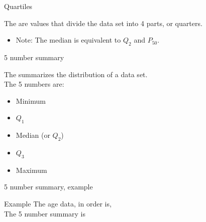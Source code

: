 \documentclass[xcolor=table, aspectratio=169, bigger]{beamer}
\begin{document}
\begin{frame}{Quartiles}
\begin{block}{}
The  are values that divide the data set into 4 parts, or quarters.\\
\smallskip
{}
\begin{itemize}
\pause
\item Note: The median is equivalent to $Q_2$ and $P_{50}$.
\end{itemize}
\end{block}
\end{frame}

\begin{frame}{5 number summary}
\begin{block}{}
The  summarizes the distribution of a data set.\\
\medskip
The 5 numbers are:
\begin{itemize}
\item Minimum
\item $Q_1$
\item Median (or $Q_2$)
\item $Q_3$
\item Maximum
\end{itemize}
\end{block}
\end{frame}

\begin{frame}{5 number summary, example}
\begin{exampleblock}{Example}
The age data, in order is, \\ \smallskip
{}
\medskip
The 5 number summary is\\ \smallskip
{}
\end{exampleblock}
\end{frame}
\end{document}
